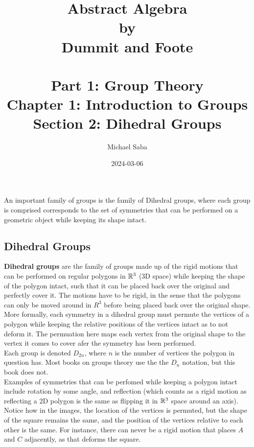 \documentclass[12pt]{article}
\title{%
    \Huge Abstract Algebra \\
    \large by \\
    \Large Dummit and Foote \\~\\
    \huge Part 1: Group Theory \\
    \LARGE Chapter 1: Introduction to Groups \\
    \Large Section 2: Dihedral Groups
}
\date{2024-03-06}
\author{Michael Saba}
\begin{document}
    \maketitle
    \newpage
    \setlength{\parindent}{0pt}

    An important family of groups
    is the family of Dihedral groups,
    where each group is comprised corresponds to the set of symmetries 
    that can be performed on a geometric object
    while keeping its shape intact. \\

    \subsection*{Dihedral Groups}

    \textbf{Dihedral groups} are the family of groups
    made up of the rigid motions that can be performed on regular polygons
    in $\mathbb{R}^3$ ($3$D space)
    while keeping the shape of the polygon intact,
    such that it can be placed back over the original
    and perfectly cover it.
    The motions have to be rigid,
    in the sense that the polygons can only be moved around in $R^3$
    before being placed back over the original shape. \\
    More formally,
    each symmetry in a dihedral group must permute the vertices of a polygon
    while keeping the relative positions of the vertices intact as to
    not deform it.
    The permuation here maps each vertex from the original shape
    to the vertex it comes to cover afer the symmetry has been performed. \\

    Each group is denoted $D_{2n}$,
    where $n$ is the number of vertices the polygon in question has.
    Most books on groups theory use the the $D_n$ notation,
    but this book does not. \\

    Examples of symmetries that can be perfomed
    while keeping a polygon intact include rotation by some angle,
    and reflection
    (which counts as a rigid motion as reflecting a $2$D polygon
    is the same as flipping it in $\mathbb{R}^3$ space around an axis). \\ 
    Notice how in the images,
    the location of the vertices is permuted,
    but the shape of the square remains the same,
    and the position of the vertices relative to each other is the same.
    For instance, there can never be a rigid motion that places
    $A$ and $C$ adjacently,
    as that deforms the square. \\
\end{document}
